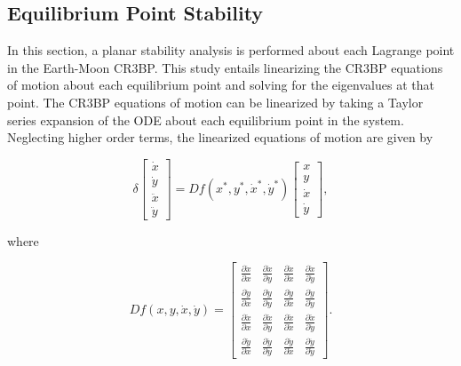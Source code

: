 \documentclass[11pt]{article} %
\begin{document}

\subsection{Equilibrium Point Stability}
In this section, a planar stability analysis is performed about each Lagrange point in the Earth-Moon CR3BP. This study entails linearizing the CR3BP equations of motion about each equilibrium point and solving for the eigenvalues at that point. The CR3BP equations of motion can be linearized by taking a Taylor series expansion of the ODE about each equilibrium point in the system. Neglecting higher order terms, the linearized equations of motion are given by

\begin{equation}
	\label{e:lin_eom}
	\delta\begin{bmatrix}\dot{x}\\\dot{y}\\\ddot{x}\\\ddot{y}\end{bmatrix} = Df\left(x^*,y^*,\dot{x}^*,\dot{y}^*\right)\begin{bmatrix}x\\y\\\dot{x}\\\dot{y}\end{bmatrix},
\end{equation}

\noindent
where

\doublespacing
\begin{equation}
	\label{e:df_raw}
	Df\left(x,y,\dot{x},\dot{y}\right) = 
	\begin{bmatrix} 
		\frac{\partial \dot{x}}{\partial x} & \frac{\partial \dot{x}}{\partial y} & \frac{\partial \dot{x}}{\partial \dot{x}}  & \frac{\partial \dot{x}}{\partial \dot{y}} \\ 
		\frac{\partial \dot{y}}{\partial x} & \frac{\partial \dot{y}}{\partial y} & \frac{\partial \dot{y}}{\partial \dot{x}} & \frac{\partial \dot{y}}{\partial \dot{y}} \\
		\frac{\partial \ddot{x}}{\partial x} & \frac{\partial \ddot{x}}{\partial y} & \frac{\partial \ddot{x}}{\partial \dot{x}} & \frac{\partial \ddot{x}}{\partial \dot{y}} \\
		\frac{\partial \ddot{y}}{\partial x} & \frac{\partial \ddot{y}}{\partial y} & \frac{\partial \ddot{y}}{\partial \dot{x}} & \frac{\partial \ddot{y}}{\partial \dot{y}}
	\end{bmatrix}.
\end{equation}
\singlespacing
\end{document}
